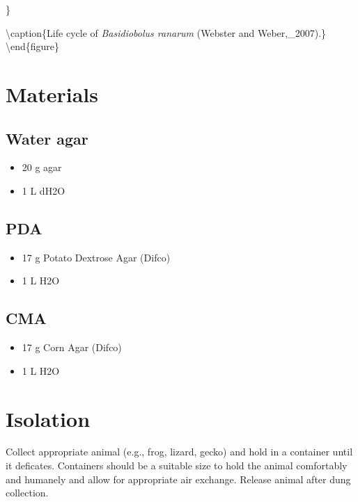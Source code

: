 \documentclass[]{book}
\providecommand{\tightlist}{%
  \setlength{\itemsep}{0pt}\setlength{\parskip}{0pt}}
\begin{document}
\}

\textbackslash caption\{Life cycle of \emph{Basidiobolus ranarum} (Webster and Weber,\_2007).\}\label{fig:ch6fig2}
\textbackslash end\{figure\}

\hypertarget{materials-3}{%
\section{Materials}\label{materials-3}}

\hypertarget{water-agar}{%
\subsection{\texorpdfstring{{Water agar}}{Water agar}}\label{water-agar}}

\begin{itemize}
\tightlist
\item
  20 g agar
\item
  1 L dH2O
\end{itemize}

\hypertarget{pda}{%
\subsection{\texorpdfstring{{PDA}}{PDA}}\label{pda}}

\begin{itemize}
\tightlist
\item
  17 g Potato Dextrose Agar (Difco)
\item
  1 L H2O
\end{itemize}

\hypertarget{cma}{%
\subsection{\texorpdfstring{{CMA}}{CMA}}\label{cma}}

\begin{itemize}
\tightlist
\item
  17 g Corn Agar (Difco)
\item
  1 L H2O
\end{itemize}

\hypertarget{isolation-1}{%
\section{Isolation}\label{isolation-1}}

Collect appropriate animal (e.g., frog, lizard, gecko) and hold in a container until it deficates. Containers should be a suitable size to hold the animal comfortably and humanely and allow for appropriate air exchange. Release animal after dung collection.
\end{document}
